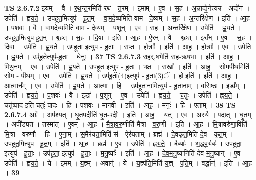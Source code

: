 \documentclass[17pt]{extarticle}
\begin{document}
                  \newline
                                \textbf{ TS 2.6.7.2} \newline
                  इ॒यम् । वै । र॒थ॒न्त॒रमिति॑ रथं - त॒रम् । इ॒माम् । ए॒व । स॒ह । अ॒न्नाद्ये॒नेत्य॑न्न - अद्ये॑न । उपेति॑ । ह्व॒य॒ते॒ । उप॑हूत॒मित्युप॑ - हू॒त॒म् । वा॒म॒दे॒व्यमिति॑ वाम - दे॒व्यम् । स॒ह । अ॒न्तरि॑क्षेण । इति॑ । आ॒ह॒ । प॒शवः॑ । वै । वा॒म॒दे॒व्यमिति॑ वाम - दे॒व्यम् । प॒शून् । ए॒व । स॒ह । अ॒न्तरि॑क्षेण । उपेति॑ । ह्व॒य॒ते॒ । उप॑हूत॒मित्युप॑-हू॒त॒म् । बृ॒हत् । स॒ह । दि॒वा । इति॑ । आ॒ह॒ । ऐ॒रम् । वै । बृ॒हत् । इरा᳚म् । ए॒व । स॒ह । दि॒वा । उपेति॑ । ह्व॒य॒ते॒ । उप॑हूता॒ इत्युप॑ - हू॒ताः॒ । स॒प्त । होत्राः᳚ । इति॑ । आ॒ह॒ । होत्राः᳚ । ए॒व । उपेति॑ । ह्व॒य॒ते॒ । उप॑हू॒तेत्युप॑-हू॒ता॒ । धे॒नुः । \textbf{  37} \newline
                  \newline
                                \textbf{ TS 2.6.7.3} \newline
                  स॒हर्.ष॒भेति॑ स॒ह-ऋ॒ष॒भा॒ । इति॑ । आ॒ह॒ । मि॒थु॒नम् । ए॒व । उपेति॑ । ह्व॒य॒ते॒ । उप॑हूत॒ इत्युप॑ - हू॒तः॒ । भ॒क्षः । सखा᳚ । इति॑ । आ॒ह॒ । सो॒म॒पी॒थमिति॑ सोम - पी॒थम् । ए॒व । उपेति॑ । ह्व॒य॒ते॒ । उप॑हू॒ताॅ(4)इत्युप॑ - हू॒ता(3)ॅ । हो इति॑ । इति॑ । आ॒ह॒ । आ॒त्मान᳚म् । ए॒व । उपेति॑ । ह्व॒य॒ते॒ । आ॒त्मा । हि । उप॑हूताना॒मित्युप॑ - हू॒ता॒ना॒म् । वसि॑ष्ठः । इडा᳚म् । उपेति॑ । ह्व॒य॒ते॒ । प॒शवः॑ । वै । इडा᳚ । प॒शून् । ए॒व । उपेति॑ । ह्व॒य॒ते॒ । च॒तुः । उपेति॑ । ह्व॒य॒ते॒ । चतु॑ष्पाद॒ इति॒ चतुः॑-पा॒दः॒ । हि । प॒शवः॑ । मा॒न॒वी । इति॑ । आ॒ह॒ । मनुः॑ । हि । ए॒ताम् । \textbf{  38} \newline
                  \newline
                                \textbf{ TS 2.6.7.4} \newline
                  अग्रे᳚ । अप॑श्यत् । घृ॒तप॒दीति॑ घृ॒त-प॒दी॒ । इति॑ । आ॒ह॒ । यत् । ए॒व । अ॒स्यै॒ । प॒दात् । घृ॒तम् । अपी᳚ड्यत । तस्मा᳚त् । ए॒वम् । आ॒ह॒ । मै॒त्रा॒व॒रु॒णीति॑ मैत्रा - व॒रु॒णी । इति॑ । आ॒ह॒ । मि॒त्रावरु॑णा॒विति॑ मि॒त्रा - वरु॑णौ । हि । ए॒ना॒म् । स॒मैर॑यता॒मिति॑ सं - ऐर॑यताम् । ब्रह्म॑ । दे॒वकृ॑त॒मिति॑ दे॒व - कृ॒त॒म् । उप॑हूत॒मित्युप॑ - हू॒त॒म् । इति॑ । आ॒ह॒ । ब्रह्म॑ । ए॒व । उपेति॑ । ह्व॒य॒ते॒ । दैव्याः᳚ । अ॒द्ध्व॒र्यवः॑ । उप॑हूता॒ इत्युप॑ - हू॒ताः॒ । उप॑हूता॒ इत्युप॑ - हू॒ताः॒ । म॒नु॒ष्याः᳚ । इति॑ । आ॒ह॒ । दे॒व॒म॒नु॒ष्यानिति॑ देव-म॒नु॒ष्यान् । ए॒व । उपेति॑ । ह्व॒य॒ते॒ । ये । इ॒मम् । य॒ज्ञ्म् । अवान्॑ । ये । य॒ज्ञ्प॑ति॒मिति॑ य॒ज्ञ् - प॒ति॒म् । वर्द्धान्॑ । इति॑ । आ॒ह॒ । \textbf{  39} \newline
                  \newline
\end{document}
